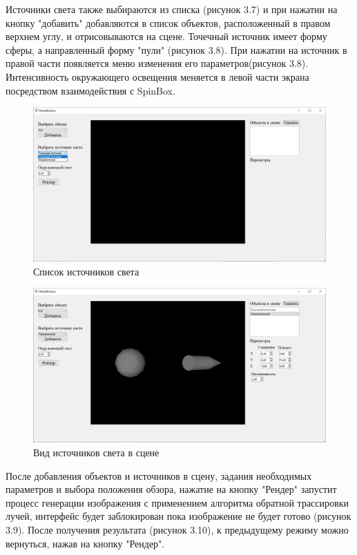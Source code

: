 \documentclass[12pt,a4paper,oneside]{report}
\begin{document}
	Источники света также выбираются из списка (рисунок 3.7) и при нажатии на кнопку "добавить" добавляются в список объектов, расположенный в правом верхнем углу, и отрисовываются на сцене. Точечный источник имеет форму сферы, а направленный форму "пули" (рисунок 3.8). При нажатии на источник в правой части появляется меню изменения его параметров(рисунок 3.8). Интенсивность окружающего освещения меняется в левой части экрана посредством взаимодействия с SpinBox.
	
	\begin{figure}[H]
		\centering
		\includegraphics[scale = 0.5]{light_list}
		\caption{Список источников света}
	\end{figure}

	\begin{figure}[H]
		\centering
		\includegraphics[scale = 0.5]{dir_point}
		\caption{Вид источников света в сцене}
	\end{figure}

	После добавления объектов и источников в сцену, задания необходимых параметров и выбора положения обзора, нажатие на кнопку "Рендер" запустит процесс генерации изображения с применением алгоритма обратной трассировки лучей, интерфейс будет заблокирован пока изображение не будет готово (рисунок 3.9). После получения результата (рисунок 3.10), к предыдущему режиму можно вернуться, нажав на кнопку "Рендер".
\end{document}
